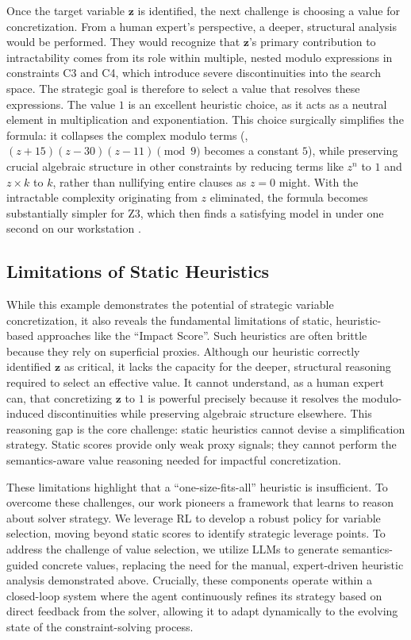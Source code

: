 Once the target variable $\mathbf{z}$ is identified, the next challenge is choosing a value for concretization. From a human expert's perspective, a deeper, structural analysis would be performed. They would recognize that $\mathbf{z}$'s primary contribution to intractability comes from its role within multiple, nested modulo expressions in constraints C3 and C4, which introduce severe discontinuities into the search space. The strategic goal is therefore to select a value that resolves these expressions. The value $1$ is an excellent heuristic choice, as it acts as a neutral element in multiplication and exponentiation. This choice surgically simplifies the formula: it collapses the complex modulo terms (\eg, $(z+15)(z-30)(z-11) \pmod 9$ becomes a constant $5$), while preserving crucial algebraic structure in other constraints by reducing terms like $z^n$ to $1$ and $z \times k$ to $k$, rather than nullifying entire clauses as $z=0$ might. With the intractable complexity originating from $z$ eliminated, the formula becomes substantially simpler for Z3, which then finds a satisfying model in under one second on our workstation .

\subsection{Limitations of Static Heuristics}

While this example demonstrates the potential of strategic variable concretization, it also reveals the fundamental limitations of static, heuristic-based approaches like the ``Impact Score''. Such heuristics are often brittle because they rely on superficial proxies. Although our heuristic correctly identified $\mathbf{z}$ as critical, it lacks the capacity for the deeper, structural reasoning required to select an effective value. It cannot understand, as a human expert can, that concretizing $\mathbf{z}$ to $1$ is powerful precisely  because it resolves the modulo-induced discontinuities while preserving algebraic structure elsewhere. This reasoning gap is the core challenge: static heuristics cannot devise a simplification strategy. Static scores provide only weak proxy signals; they cannot perform the semantics-aware value reasoning needed for impactful concretization.

These limitations highlight that a ``one-size-fits-all'' heuristic is insufficient. To overcome these challenges, our work pioneers a framework that learns to reason about solver strategy. We leverage RL to develop a robust policy for variable selection, moving beyond static scores to identify strategic leverage points. To address the challenge of value selection, we utilize LLMs to generate semantics-guided concrete values, replacing the need for the manual, expert-driven heuristic analysis demonstrated above. Crucially, these components operate within a closed-loop system where the agent continuously refines its strategy based on direct feedback from the solver, allowing it to adapt dynamically to the evolving state of the constraint-solving process.

